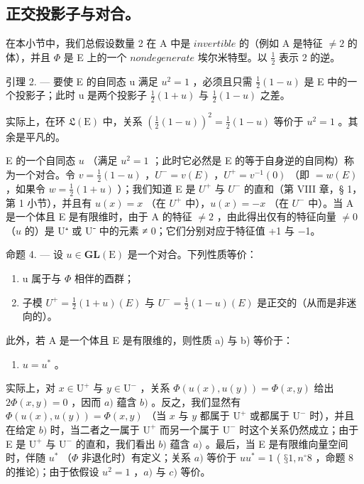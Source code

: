 \subsection{正交投影子与对合。}

在本小节中，我们总假设数量 2 在 A 中是 \(invertible\) 的（例如 A 是特征 \(\neq 2\) 的体），并且 \(\Phi\) 是 E 上的一个 \(nondegenerate\) 埃尔米特型。以 \(\frac{1}{2}\) 表示 2 的逆。

引理 2. --- 要使 E 的自同态 u 满足 \(u^{2}=1\) ，必须且只需 \(\frac{1}{2}(1-u)\) 是 E 中的一个投影子；此时 u 是两个投影子 \(\frac{1}{2}(1+u)\) 与 \(\frac{1}{2}(1-u)\) 之差。

实际上，在环 \(\mathfrak{L}(\mathrm{E})\) 中，关系 \(\left(\frac{1}{2}(1 - u)\right)^2 = \frac{1}{2}(1 - u)\) 等价于 \(u^2 = 1\) 。其余是平凡的。

E 的一个自同态 \(u\) （满足 \(u^2 = 1\) ；此时它必然是 E 的等于自身逆的自同构）称为一个对合。令 \(v = \frac{1}{2}(1 - u)\) ，\(U^- = v(E)\) ，\(U^+ = v^{-1}(0)\) （即 \(= w(E)\) ，如果令 \(w = \frac{1}{2}(1 + u)\) ）；我们知道 E 是 \(U^+\) 与 \(U^-\) 的直和（第 VIII 章，§ 1，第 1 小节），并且有 \(u(x) = x\) （在 \(U^+\) 中），\(u(x) = -x\) （在 \(U^-\) 中）。当 A 是一个体且 E 是有限维时，由于 A 的特征 \(\neq 2\) ，由此得出仅有的特征向量 \(\neq 0\) （\(u\) 的）是 U⁺ 或 U⁻ 中的元素 ≠ 0；它们分别对应于特征值 +1 与 −1。

命题 4. --- 设 \(u \in \mathbf{GL}(\mathrm{E})\) 是一个对合。下列性质等价：

\begin{enumerate}
\def\labelenumi{\alph{enumi})}
\item
  u 属于与 \(\Phi\) 相伴的酉群；
\item
  子模 \(U^{+} = \frac{1}{2}(1 + u)(E)\) 与 \(U^{-} = \frac{1}{2}(1 - u)(E)\) 是正交的（从而是非迷向的）。
\end{enumerate}

此外，若 A 是一个体且 E 是有限维的，则性质 a) 与 b) 等价于：

\begin{enumerate}
\def\labelenumi{\alph{enumi})}
\setcounter{enumi}{2}
\tightlist
\item
  \(u = u^{*}\) 。
\end{enumerate}

实际上，对 \(x \in \mathrm{U}^{+}\) 与 \(y \in \mathrm{U}^{-}\) ，关系 \(\Phi(u(x), u(y)) = \Phi(x, y)\) 给出 \(2\Phi(x, y) = 0\) ，因而 \(a)\) 蕴含 \(b)\) 。反之，我们显然有 \(\Phi(u(x), u(y)) = \Phi(x, y)\) （当 \(x\) 与 \(y\) 都属于 \(\mathrm{U}^{+}\) 或都属于 \(\mathrm{U}^{-}\) 时），并且在给定 \(b)\) 时，当二者之一属于 \(\mathrm{U}^{+}\) 而另一个属于 \(\mathrm{U}^{-}\) 时这个关系仍然成立；由于 E 是 \(\mathrm{U}^{+}\) 与 \(\mathrm{U}^{-}\) 的直和，我们看出 \(b)\) 蕴含 \(a)\) 。最后，当 E 是有限维向量空间时，伴随 \(u^{*}\) （\(\Phi\) 非退化时）有定义；关系 \(a)\) 等价于 \(uu^{*} = 1\) ( \(§ 1, n^{\circ} 8\) ，命题 8 的推论)；由于依假设 \(u^{2} = 1\) ，\(a)\) 与 \(c)\) 等价。

